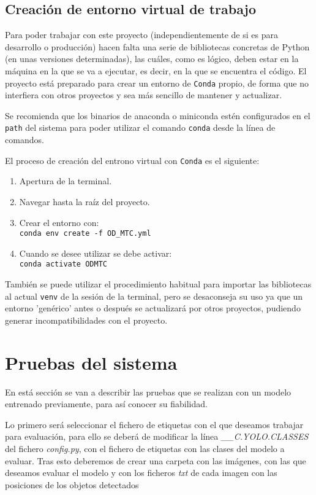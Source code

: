 \subsection{Creación de entorno virtual de trabajo}
Para poder trabajar con este proyecto (independientemente de si es para desarrollo o producción) hacen falta una serie de bibliotecas concretas de Python (en unas versiones determinadas), las cuáles, como es lógico, deben estar en la máquina en la que se va a ejecutar, es decir, en la que se encuentra el código. 
El proyecto está preparado para crear un entorno de \texttt{Conda} propio, de forma que no interfiera con otros proyectos y sea más sencillo de mantener y actualizar.

Se recomienda que los binarios de anaconda o miniconda estén configurados en el \texttt{path} del sistema para poder utilizar el comando \texttt{conda} desde la línea de comandos.

El proceso de creación del entrono virtual con \texttt{Conda} es el siguiente:
\begin{enumerate}
\tightlist
\item Apertura de la terminal.
\item Navegar hasta la raíz del proyecto.
\item Crear el entorno con:\\
\texttt{conda env create -f OD\_MTC.yml}
\item Cuando se desee utilizar se debe activar:\\
\texttt{conda activate ODMTC}
\end{enumerate}

También se puede utilizar el procedimiento habitual para importar las bibliotecas al actual \texttt{venv} de la sesión de la terminal, pero se desaconseja su uso ya que un entorno 'genérico' antes o después se actualizará por otros proyectos, pudiendo generar incompatibilidades con el proyecto.

\section{Pruebas del sistema}
En está sección se van a describir las pruebas que se realizan con un modelo entrenado previamente, para así conocer su fiabilidad.

Lo primero será seleccionar el fichero de etiquetas con el que deseamos trabajar para evaluación, para ello se deberá de modificar la línea \textit{\_\_C.YOLO.CLASSES} del fichero \textit{config.py}, con el fichero de etiquetas con las clases del modelo a evaluar.
Tras esto deberemos de crear una carpeta con las imágenes, con las que deseamos evaluar el modelo y con los ficheros \textit{txt} de cada imagen con las posiciones de los objetos detectados

